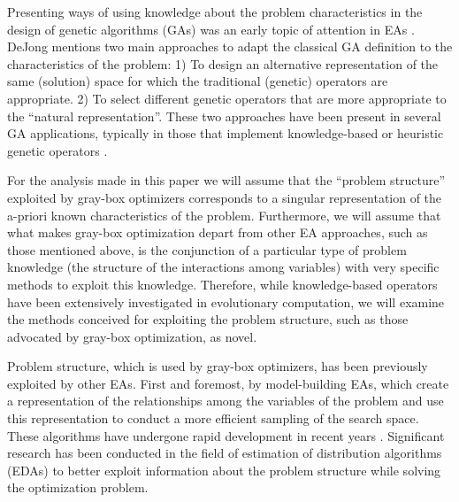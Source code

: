 \documentclass{article} %
\begin{document}


 Presenting ways of using knowledge about the problem characteristics in the design of genetic algorithms (GAs) \cite{Goldberg:1989,Holland:1975} was an early topic of attention in EAs \cite{Beasley_et_al:1993,Clearwater_and_Hogg:1994,Maini_et_al:1994}.  DeJong \cite{DeJong:1988} mentions two main approaches to adapt the classical GA definition to the characteristics of the problem: 1) To design an alternative representation of the same (solution) space for which the traditional (genetic) operators are appropriate. 2) To select different genetic operators that are more appropriate to the ``natural representation''. These two approaches have been present in several GA applications, typically in those that implement knowledge-based or heuristic genetic operators  \cite{Butz_et_al:2006,Goldberg_et_al:1993,Riff:1997,TianLi_et_al:2009}.

 For the analysis made in this paper we will assume that the ``problem structure'' exploited by gray-box optimizers corresponds to a singular representation of the a-priori known characteristics of the problem. Furthermore, we will assume that what makes gray-box optimization depart from other EA approaches, such as those mentioned above, is the conjunction of a particular type of problem knowledge (the structure of the  interactions among variables) with very specific methods to exploit this knowledge. Therefore,  while  knowledge-based operators have been extensively investigated in evolutionary computation, we will examine the methods conceived for exploiting the problem structure, such as those advocated by gray-box optimization, as novel.  

 
 Problem structure, which is used by gray-box optimizers, has been previously exploited by other EAs. First and foremost, by model-building EAs, which create a representation of the relationships among the variables of the problem and use this representation to conduct a more efficient sampling of the search space. These algorithms have undergone rapid development in recent years \cite{Bosman_and_Grahl:2008,Grahl_et_al:2008,Larranaga_et_al:2012,Shakya_and_Santana:2012a,Zhou_et_al:2008,Zlochin_et_al:2004}.   Significant research has been conducted in the field of estimation of distribution algorithms (EDAs) \cite{Larranaga_et_al:2012,Muhlenbein_and_Paas:1996r}  to better exploit information about the problem structure while solving the optimization problem. 
\end{document}
